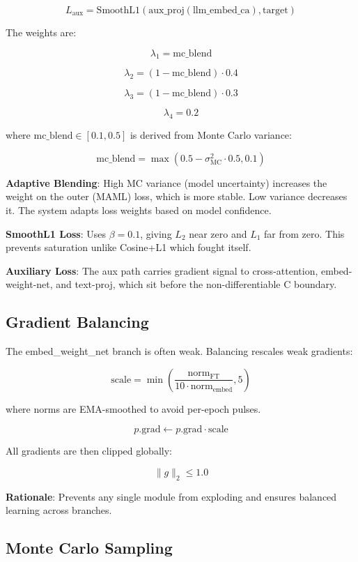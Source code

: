 \documentclass[12pt]{article}
\begin{document}
\[
  L_{\text{aux}} = \text{SmoothL1}(\text{aux\_proj}(\text{llm\_embed\_ca}),
    \text{target})
\]

The weights are:

\[
  \lambda_1 = \text{mc\_blend}
\]

\[
  \lambda_2 = (1 - \text{mc\_blend}) \cdot 0.4
\]

\[
  \lambda_3 = (1 - \text{mc\_blend}) \cdot 0.3
\]

\[
  \lambda_4 = 0.2
\]

where $\text{mc\_blend} \in [0.1, 0.5]$ is derived from Monte Carlo
variance:

\[
  \text{mc\_blend} = \max(0.5 - \sigma^2_{\text{MC}} \cdot 0.5, 0.1)
\]

\textbf{Adaptive Blending}: High MC variance (model uncertainty)
increases the weight on the outer (MAML) loss, which is more stable. Low
variance decreases it. The system adapts loss weights based on model
confidence.

\textbf{SmoothL1 Loss}: Uses $\beta = 0.1$, giving $L_2$ near zero and
$L_1$ far from zero. This prevents saturation unlike Cosine+L1 which
fought itself.

\textbf{Auxiliary Loss}: The aux path carries gradient signal to
cross-attention, embed-weight-net, and text-proj, which sit before the
non-differentiable C boundary.

\subsection{Gradient Balancing}

The embed\_weight\_net branch is often weak. Balancing rescales weak
gradients:

\[
  \text{scale} = \min\left( \frac{\text{norm}_{\text{FT}}}{10 \cdot
    \text{norm}_{\text{embed}}}, 5 \right)
\]

where norms are EMA-smoothed to avoid per-epoch pulses.

\[
  p.\text{grad} \leftarrow p.\text{grad} \cdot \text{scale}
\]

All gradients are then clipped globally:

\[
  \|g\|_2 \leq 1.0
\]

\textbf{Rationale}: Prevents any single module from exploding and ensures
balanced learning across branches.

\subsection{Monte Carlo Sampling}
\end{document}
